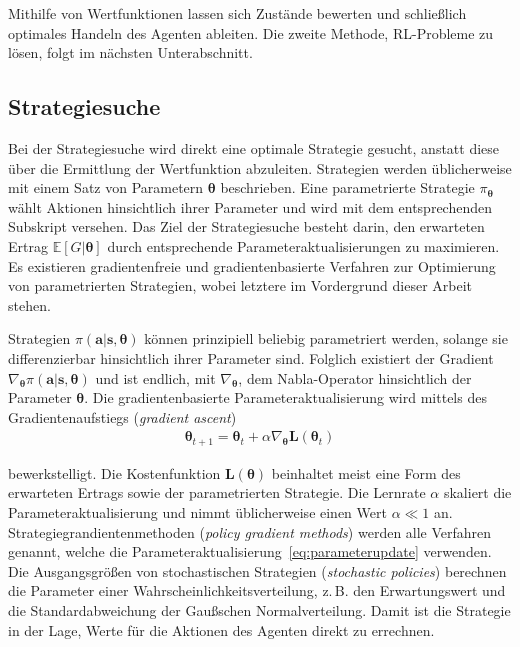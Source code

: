 Mithilfe von Wertfunktionen lassen sich Zustände bewerten und schließlich optimales Handeln des Agenten ableiten. Die zweite Methode, RL-Probleme zu lösen, folgt im nächsten Unterabschnitt.






\subsection{Strategiesuche}
\label{subsec:strategiesuche}

Bei der Strategiesuche wird direkt eine optimale Strategie gesucht, anstatt diese über die Ermittlung der Wertfunktion abzuleiten. Strategien werden üblicherweise mit einem Satz von Parametern $\bm{\theta}$ beschrieben. Eine parametrierte Strategie $\pi_{\bm{\theta}}$ wählt Aktionen hinsichtlich ihrer Parameter und wird mit dem entsprechenden Subskript versehen. Das Ziel der Strategiesuche besteht darin, den erwarteten Ertrag 
$\mathds{E}[G|\bm{\theta}]$ 
durch entsprechende Parameteraktualisierungen zu maximieren. Es existieren gradientenfreie und gradientenbasierte Verfahren zur Optimierung von parametrierten Strategien, wobei letztere im Vordergrund dieser Arbeit stehen. \newline

Strategien $\pi(\bm{a}|\bm{s},\bm{\theta})$ können prinzipiell beliebig parametriert werden, solange sie differenzierbar hinsichtlich ihrer Parameter sind. Folglich existiert der Gradient $\nabla_{\bm{\theta}}\pi(\bm{a}|\bm{s},\bm{\theta})$ und ist endlich, mit $\nabla_{\bm{\theta}}$, dem Nabla-Operator hinsichtlich der Parameter $\bm{\theta}$.  Die gradientenbasierte Parameteraktualisierung wird mittels des Gradientenaufstiegs (\textit{gradient ascent})
\begin{align}
\bm{\theta}_{t+1} = \bm{\theta}_t + \alpha \nabla_{\bm{\theta}} \bm{L}(\bm{\theta}_t)
\label{eq:parameterupdate}
\end{align}

bewerkstelligt. Die Kostenfunktion $\bm{L}(\bm{\theta})$ beinhaltet meist eine Form des erwarteten Ertrags sowie der parametrierten Strategie. Die Lernrate $\alpha$ skaliert die Parameteraktualisierung und nimmt üblicherweise einen Wert $\alpha \ll 1$ an. Strategiegrandientenmethoden (\textit{policy gradient methods}) werden alle Verfahren genannt, welche die Parameteraktualisierung~\eqref{eq:parameterupdate} verwenden. 
Die Ausgangsgrößen von stochastischen Strategien (\textit{stochastic policies}) berechnen die Parameter einer Wahrscheinlichkeitsverteilung, z.\,B. den Erwartungswert und die Standardabweichung der Gaußschen Normalverteilung. Damit ist die Strategie in der Lage, Werte für die Aktionen des Agenten direkt zu errechnen. 

